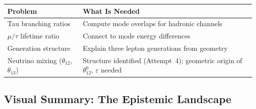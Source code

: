\begin{center}
\begin{tabular}{p{5cm}p{8cm}}
\toprule
\textbf{Problem} & \textbf{What Is Needed} \\
\midrule
Tau branching ratios & Compute mode overlaps for hadronic channels \\
$\mu/\tau$ lifetime ratio & Connect to mode energy differences \\
Generation structure & Explain three lepton generations from geometry \\
Neutrino mixing ($\theta_{12}$, $\theta_{13}$) & Structure identified (Attempt~4); geometric origin of $\theta_{12}^0$, $\varepsilon$ needed \\
\bottomrule
\end{tabular}
\end{center}

\subsection{Visual Summary: The Epistemic Landscape}


